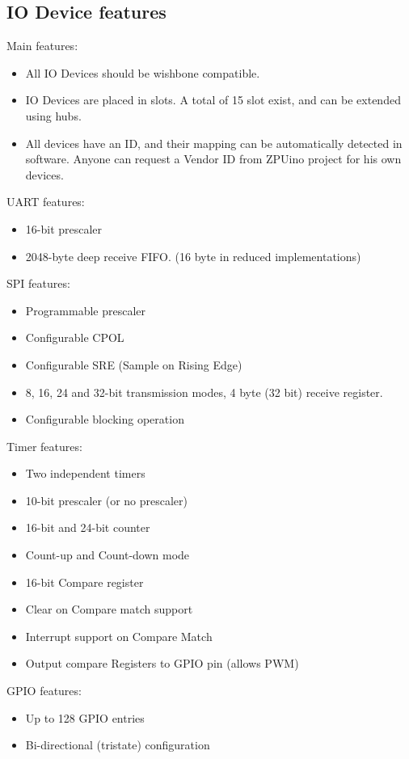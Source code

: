 \subsection{IO Device features}
Main features:
\begin{itemize}
\item All IO Devices should be wishbone compatible.
\item IO Devices are placed in slots. A total of 15 slot exist, and can be extended using hubs.
\item All devices have an ID, and their mapping can be automatically detected in software. Anyone can request a Vendor ID from
ZPUino project for his own devices.
\end{itemize}


UART features:
\begin{itemize}
\item 16-bit prescaler
\item 2048-byte deep receive FIFO. (16 byte in reduced implementations)
\end{itemize}

SPI features:
\begin{itemize}
\item Programmable prescaler
\item Configurable CPOL
\item Configurable SRE (Sample on Rising Edge)
\item 8, 16, 24 and 32-bit transmission modes, 4 byte (32 bit) receive register.
\item Configurable blocking operation
\end{itemize}

Timer features:
\begin{itemize}
\item Two independent timers
\item 10-bit prescaler (or no prescaler)
\item 16-bit and 24-bit counter
\item Count-up and Count-down mode
\item 16-bit Compare register
\item Clear on Compare match support
\item Interrupt support on Compare Match
\item Output compare Registers to GPIO pin (allows PWM)
\end{itemize}

GPIO features:
\begin{itemize}
\item Up to 128 GPIO entries
\item Bi-directional (tristate) configuration
\end{itemize}

